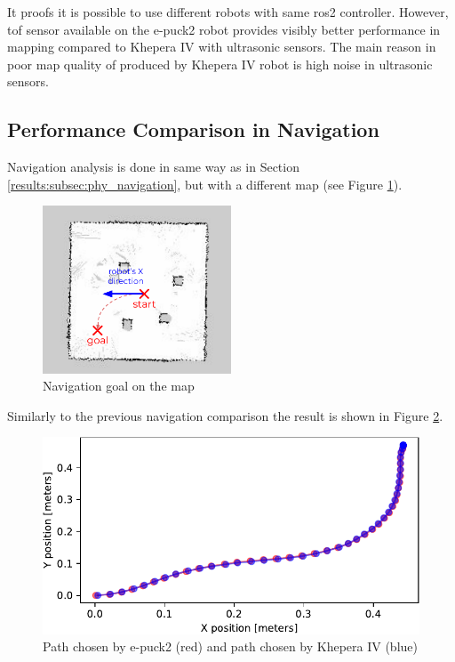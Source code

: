 It proofs it is possible to use different robots with same \ac{ros2} controller.
However, \ac{tof} sensor available on the e-puck2 robot provides visibly better performance in mapping compared to Khepera IV with ultrasonic sensors.
The main reason in poor map quality of produced by Khepera IV robot is high noise in ultrasonic sensors.

\subsection{Performance Comparison in Navigation}

Navigation analysis is done in same way as in Section \ref{results:subsec:phy_navigation}, but with a different map (see Figure \ref{fig:results:nav_goal}).

\begin{figure}[H]
    \centering
    \includegraphics[width=0.5\textwidth]{./results/figures/nav_goal}
    \caption{Navigation goal on the map}
    \label{fig:results:nav_goal}
\end{figure}

Similarly to the previous navigation comparison the result is shown in Figure \ref{fig:results:simulated_navigation_comparison}.

\begin{figure}[H]
    \centering
    \includegraphics[width=\textwidth]{./results/figures/simulated_navigation_comparison}
    \caption{Path chosen by e-puck2 (red) and path chosen by Khepera IV (blue)}
    \label{fig:results:simulated_navigation_comparison}
\end{figure}

